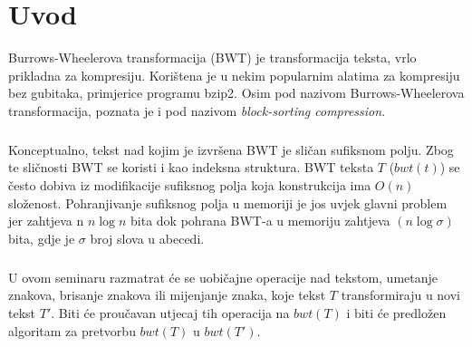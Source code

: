 \documentclass{ferseminar}
\begin{document}
\stvoripredstranice
\section{Uvod}
Burrows-Wheelerova transformacija (BWT) je transformacija teksta, vrlo prikladna za kompresiju. Korištena je u nekim popularnim alatima za kompresiju bez gubitaka, primjerice programu bzip2.  Osim pod nazivom Burrows-Wheelerova transformacija, poznata je i pod nazivom \textit{block-sorting compression}. 
\subparagraph{}
Konceptualno, tekst nad kojim je izvršena BWT je sličan sufiksnom polju. Zbog te sličnosti BWT se koristi i kao indeksna struktura. BWT teksta $T$ ($bwt(t)$) se često dobiva iz modifikacije sufiksnog polja koja konstrukcija ima $O(n)$ složenost. Pohranjivanje sufiksnog polja u memoriji je jos uvjek glavni problem jer zahtjeva n $n\log{}n$ bita dok pohrana BWT-a u memoriju zahtjeva $(n\log{}\sigma)$ bita, gdje je $\sigma$ broj slova u abecedi.
\subparagraph{}
U ovom seminaru razmatrat će se uobičajne operacije nad tekstom, umetanje znakova, brisanje znakova ili mijenjanje znaka, koje tekst $T$ transformiraju u novi tekst $T'$. Biti će proučavan utjecaj tih operacija na $bwt(T)$ i biti će predložen algoritam za pretvorbu $bwt(T)$ u $bwt(T')$.
\end{document}
